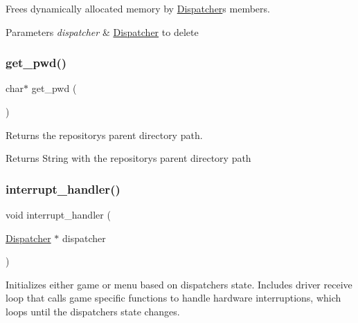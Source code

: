 Frees dynamically allocated memory by \hyperlink{struct_dispatcher}{Dispatcher}\textquotesingle{}s members. 


\begin{DoxyParams}{Parameters}
{\em dispatcher} & \hyperlink{struct_dispatcher}{Dispatcher} to delete \\
\hline
\end{DoxyParams}
\hypertarget{group__dispatcher_ga5ac2060f25333e39dcf8ea5a304b310f}{}\label{group__dispatcher_ga5ac2060f25333e39dcf8ea5a304b310f} 
\subsubsection{\texorpdfstring{get\+\_\+pwd()}{get\_pwd()}}
{\footnotesize\ttfamily char$\ast$ get\+\_\+pwd (\begin{DoxyParamCaption}{ }\end{DoxyParamCaption})}



Returns the repository\textquotesingle{}s parent directory path. 

\begin{DoxyReturn}{Returns}
String with the repository\textquotesingle{}s parent directory path 
\end{DoxyReturn}
\hypertarget{group__dispatcher_ga2f999b67515a92fc53d29324552cd141}{}\label{group__dispatcher_ga2f999b67515a92fc53d29324552cd141} 
\subsubsection{\texorpdfstring{interrupt\+\_\+handler()}{interrupt\_handler()}}
{\footnotesize\ttfamily void interrupt\+\_\+handler (\begin{DoxyParamCaption}\item[{\hyperlink{struct_dispatcher}{Dispatcher} $\ast$}]{dispatcher }\end{DoxyParamCaption})}



Initializes either game or menu based on dispatcher\textquotesingle{}s state. Includes driver receive loop that calls game specific functions to handle hardware interruptions, which loops until the dispatcher\textquotesingle{}s state changes. 


